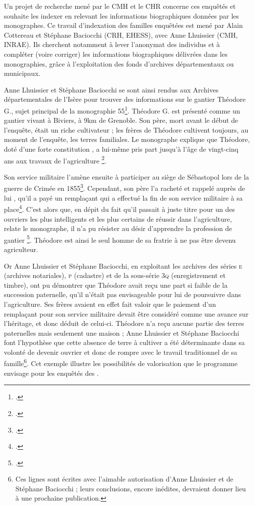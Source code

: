 Un projet de recherche mené par le CMH et le CHR concerne ces enquêtés et souhaite les indexer en relevant les informations biographiques données par les monographes. Ce travail d'indexation des familles enquêtées est mené par Alain Cottereau et Stéphane Baciocchi (CRH, EHESS), avec Anne Lhuissier (CMH, INRAE). Ils  cherchent notamment à lever l'anonymat  des individus et à compléter (voire corriger) les informations biographiques délivrées dans les monographies, grâce à l'exploitation des fonds d'archives départementaux ou municipaux.

Anne Lhuissier et Stéphane Baciocchi se sont ainsi rendus aux Archives départementales de l'Isère pour trouver des informations sur le gantier Théodore  G., sujet principal de la monographie \no{} 55\footcite{mono055a}. Théodore  G. est présenté comme un gantier vivant à Biviers, à 9km de Grenoble. Son père, mort avant le début de l'enquête, était un riche cultivateur ; les frères de Théodore cultivent toujours, au moment de l'enquête, les terres familiales. Le monographe explique que Théodore, doté \og d'une forte constitution \fg{}, a lui-même \og pris part jusqu'à l'âge de vingt-cinq ans aux travaux de l'agriculture \fg{}\footcite[p. 471]{mono055a}.

Son service militaire l'amène ensuite à participer au siège de Sébastopol lors de la guerre de Crimée en 1855\footcite[p. 471]{mono055a}. Cependant, son père \og l'a racheté et rappelé auprès de lui \fg{}, \cad{} qu'il a payé un remplaçant qui a effectué la fin de son service militaire à sa place\footcite[p. 471]{mono055a}. C'est alors que, en dépit du fait qu'il \og passait à juste titre pour un des ouvriers les plus intelligents et les plus certains de réussir \fg{} dans l'agriculture, relate le monographe, \og il n'a pu résister au désir d'apprendre la profession de gantier \fg{}\footcite[p. 471]{mono055a}. Théodore est ainsi le seul homme de sa fratrie à ne pas être devenu agriculteur.

Or Anne Lhuissier et Stéphane Baciocchi, en exploitant les archives des séries \textsc{e} (archives notariales), \textsc{p} (cadastre) et de la sous-série \textsc{3q} (enregistrement et timbre), ont pu démontrer que Théodore avait reçu une part si faible de la succession paternelle, qu'il n'était pas envisageable pour lui de poursuivre dans l'agriculture. Ses frères avaient en effet fait valoir que le paiement d'un remplaçant pour son service militaire devait être considéré comme une avance sur l'héritage, et donc déduit de celui-ci. Théodore n'a reçu aucune partie des terres paternelles mais seulement une maison ; Anne Lhuissier et Stéphane Baciocchi font l'hypothèse que cette absence de terre à cultiver a été déterminante dans sa volonté de devenir ouvrier et donc de rompre avec le travail traditionnel de sa famille\footnote{Ces lignes sont écrites avec l'aimable autorisation d'Anne Lhuissier et de Stéphane Baciocchi ; leurs conclusions, encore inédites, devraient donner lieu à une prochaine publication.}. Cet exemple illustre les possibilités de valorisation que le programme \timeus{} envisage pour les enquêtés des \odm.

